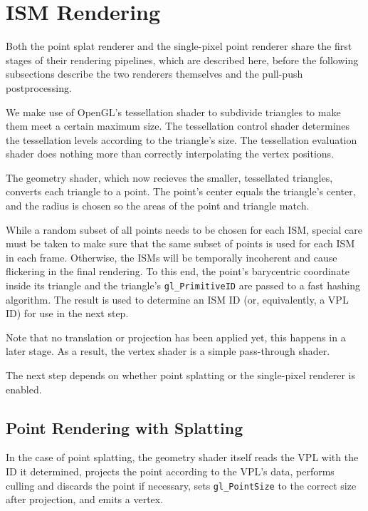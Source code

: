 \section{ISM Rendering}
\label{sec:impl:ismRendering}

Both the point splat renderer and the single-pixel point renderer share the first stages of their rendering pipelines, which are described here, before the following subsections describe the two renderers themselves and the pull-push postprocessing.

We make use of OpenGL's tessellation shader to subdivide triangles to make them meet a certain maximum size. The tessellation control shader determines the tessellation levels according to the triangle's size. The tessellation evaluation shader does nothing more than correctly interpolating the vertex positions.

The geometry shader, which now recieves the smaller, tessellated triangles, converts each triangle to a point. The point's center equals the triangle's center, and the radius is chosen so the areas of the point and triangle match.


While a random subset of all points needs to be chosen for each ISM, special care must be taken to make sure that the same subset of points is used for each ISM in each frame. Otherwise, the ISMs will be temporally incoherent and cause flickering in the final rendering. To this end, the point's barycentric coordinate inside its triangle and the triangle's \texttt{gl\_PrimitiveID} are passed to a fast hashing algorithm. The result is used to determine an ISM ID (or, equivalently, a VPL ID) for use in the next step.

Note that no translation or projection has been applied yet, this happens in a later stage. As a result, the vertex shader is a simple pass-through shader.

The next step depends on whether point splatting or the single-pixel renderer is enabled.



\subsection{Point Rendering with Splatting}
\label{sec:impl:splatting}

In the case of point splatting, the geometry shader itself reads the VPL with the ID it determined, projects the point according to the VPL's data, performs culling and discards the point if necessary, sets \texttt{gl\_PointSize} to the correct size after projection, and emits a vertex.

